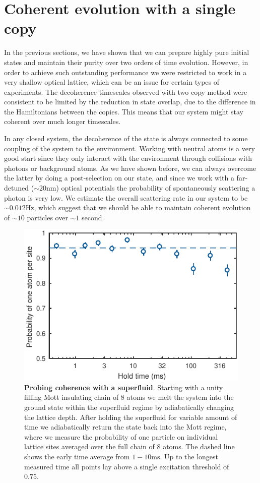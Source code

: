 \section{Coherent evolution with a single copy}
In the previous sections, we have shown that we can prepare highly pure initial states and maintain their purity over two orders of time evolution. However, in order to achieve such outstanding performance we were restricted to work in a very shallow optical lattice, which can be an issue for certain types of experiments. The decoherence timescales observed with two copy method were consistent to be limited by the reduction in state overlap, due to the difference in the Hamiltonians between the copies. This means that our system might stay coherent over much longer timescales.

In any closed system, the decoherence of the state is always connected to some coupling of the system to the environment. Working with neutral atoms is a very good start since they only interact with the environment through collisions with photons or background atoms. As we have shown before, we can always overcome the latter by doing a post-selection on our state, and since we work with a far-detuned ($\sim 20 \mathrm{nm}$) optical potentials the probability of spontaneously scattering a photon is very low. We estimate the overall scattering rate in our system to be $\sim 0.012 \mathrm{Hz}$, which suggest that we should be able to maintain coherent evolution of $\sim 10$ particles over $\sim 1$ second.

\begin{figure}[t]
	\centering
	\includegraphics[scale=1]{figures/CBH_melt_and_back_p1.pdf}
	\caption{{\bf Probing coherence with a superfluid}. Starting with a unity filling Mott insulating chain of 8 atoms we melt the system into the ground state within the superfluid regime by adiabatically changing the lattice depth. After holding the superfluid for variable amount of time we adiabatically return the state back into the Mott regime, where we measure the probability of one particle on individual lattice sites averaged over the full chain of $8$ atoms. The dashed line shows the early time average from $1-10\mathrm{ms}$. Up to the longest measured time all points lay above a single excitation threshold of $0.75$.} 
	\label{fig:CBH_melt_and_back}
\end{figure}

